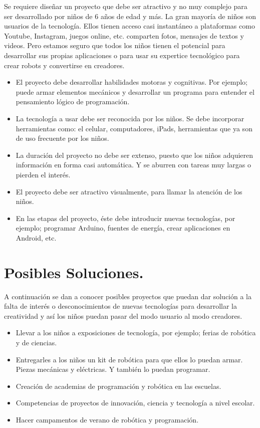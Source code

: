 \documentclass[11pt]{article}
\begin{document}
Se requiere diseñar un proyecto que debe ser atractivo y no muy complejo para ser desarrollado por niños de 6 años de edad y más. La gran mayoría de niños son usuarios de la tecnología. Ellos tienen acceso casi instantáneo a plataformas como Youtube, Instagram, juegos online, etc. comparten fotos, mensajes de textos y videos. Pero estamos seguro que todos los niños tienen el potencial para desarrollar sus propias aplicaciones o para usar su expertice tecnológico para crear robots y convertirse en creadores.

\begin{itemize}
\item  El proyecto debe desarrollar habilidades motoras y cognitivas. Por ejemplo; puede armar elementos mecánicos y desarrollar un programa para entender el pensamiento lógico de programación.
\item  La tecnología a usar debe ser reconocida por los niños. Se debe incorporar herramientas como: el celular, computadores, iPads, herramientas que ya son de uso frecuente por los niños. 
\item  La duración del proyecto no debe ser extenso, puesto que los niños adquieren información en forma casi automática. Y se aburren con tareas muy largas o pierden el interés.
\item El proyecto debe ser atractivo visualmente, para llamar la atención de los niños. 
\item En las etapas del proyecto, éste debe introducir nuevas tecnologías, por ejemplo; programar Arduino, fuentes de energía, crear aplicaciones en Android, etc.

\end{itemize}


\section{Posibles Soluciones.}

A continuación se dan a conocer posibles proyectos que puedan dar solución a la falta de interés o desconocimientos de nuevas tecnologías para desarrollar la creatividad y así los niños puedan pasar del modo usuario al modo creadores.

\begin{itemize}
\item  Llevar a los niños a exposiciones de tecnología, por ejemplo; ferias de robótica y de ciencias.
\item  Entregarles a los niños un kit de robótica para que ellos lo puedan armar. Piezas mecánicas y eléctricas. Y también lo puedan programar.
\item  Creación de academias de programación y robótica en las escuelas.
\item  Competencias de proyectos de innovación, ciencia y tecnología a nivel escolar. 
\item  Hacer campamentos de verano de robótica y programación.

\end{itemize}
\end{document}
